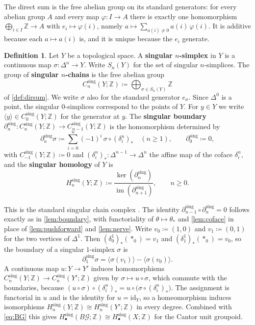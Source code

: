\documentclass{extracta-temp-26}
\numberwithin{equation}{section}
\theoremstyle{definition}
\newtheorem{defi}[teo]{Definition}
\theoremstyle{remark}
\newcommand{\G}{\mathcal{G}}
\newcommand{\Z}{\mathbb{Z}}
\newcommand{\id}{\mathrm{id}}
\newcommand{\Hsing}{H^{\mathrm{sing}}}
\newcommand{\Csing}{C^{\mathrm{sing}}}
\newcommand{\dsing}{\partial^{\mathrm{sing}}}
\newcommand{\gen}[1]{\langle #1\rangle}
\DeclareMathOperator{\im}{im}
\newcommand{\term}[1]{\textbf{#1}}
\begin{document}
The direct sum is the free abelian group on its standard generators: for every abelian group \(A\) and every map \(\varphi\colon I\to A\) there is exactly one homomorphism \(\bigoplus_{i\in I}\Z\to A\) with \(e_i\mapsto\varphi(i)\), namely \(a\mapsto\sum_{a(i)\neq 0}a(i)\,\varphi(i)\).
It is additive because each \(a\mapsto a(i)\) is, and it is unique because the \(e_i\) generate.

\begin{defi}\label{def:sing}
Let \(Y\) be a topological space.
A \term{singular \(n\)-simplex} in \(Y\) is a continuous map \(\sigma\colon\Delta^n\to Y\).
Write \(S_n(Y)\) for the set of singular \(n\)-simplices.
The group of \term{singular \(n\)-chains} is the free abelian group
\begin{equation}\label{eq:sing-chains}
\Csing_n(Y;\Z)\coloneqq\bigoplus_{\sigma\in S_n(Y)}\Z
\end{equation}
of \cref{def:dirsum}.
We write \(\sigma\) also for the standard generator \(e_\sigma\).
Since \(\Delta^0\) is a point, the singular \(0\)-simplices correspond to the points of \(Y\).
For \(y\in Y\) we write \(\gen{y}\in\Csing_0(Y;\Z)\) for the generator at \(y\).
The \term{singular boundary} \(\dsing_n\colon\Csing_n(Y;\Z)\to\Csing_{n-1}(Y;\Z)\) is the homomorphism determined by
\begin{equation}\label{eq:sing-boundary}
\dsing_n\sigma\coloneqq\sum_{i=0}^n(-1)^i\,\sigma\circ(\delta^n_i)_*
\quad(n\ge 1),
\qquad
\dsing_0\coloneqq 0,
\end{equation}
with \(\Csing_{-1}(Y;\Z)\coloneqq 0\) and \((\delta^n_i)_*\colon\Delta^{n-1}\to\Delta^n\) the affine map of the coface \(\delta^n_i\), and the \term{singular homology} of \(Y\) is
\begin{equation}\label{eq:sing-homology}
\Hsing_n(Y;\Z)\coloneqq\frac{\ker(\dsing_n)}{\im(\dsing_{n+1})},
\qquad n\ge 0.
\end{equation}
\end{defi}

This is the standard singular chain complex \cite[Section~2.1]{hatcher2002algebraic}.
The identity \(\dsing_{n-1}\circ\dsing_n=0\) follows exactly as in \cref{lem:boundary}, with functoriality of \(\theta\mapsto\theta_*\) and \cref{lem:coface} in place of \cref{lem:pushforward} and \cref{lem:nerve}.
Write \(v_0\coloneqq(1,0)\) and \(v_1\coloneqq(0,1)\) for the two vertices of \(\Delta^1\).
Then \((\delta^1_0)_*(\ast_0)=v_1\) and \((\delta^1_1)_*(\ast_0)=v_0\), so the boundary of a singular \(1\)-simplex \(\sigma\) is
\begin{equation}\label{eq:boundary-one}
\dsing_1\sigma=\gen{\sigma(v_1)}-\gen{\sigma(v_0)}.
\end{equation}
A continuous map \(u\colon Y\to Y'\) induces homomorphisms \(\Csing_n(Y;\Z)\to\Csing_n(Y';\Z)\) given by \(\sigma\mapsto u\circ\sigma\), which commute with the boundaries, because \((u\circ\sigma)\circ(\delta^n_i)_*=u\circ\bigl(\sigma\circ(\delta^n_i)_*\bigr)\).
The assignment is functorial in \(u\) and is the identity for \(u=\id_Y\), so a homeomorphism induces isomorphisms \(\Hsing_n(Y;\Z)\cong\Hsing_n(Y';\Z)\) in every degree.
Combined with \eqref{eq:BG} this gives \(\Hsing_\bullet(B\G;\Z)\cong\Hsing_\bullet(X;\Z)\) for the Cantor unit groupoid.
\end{document}
